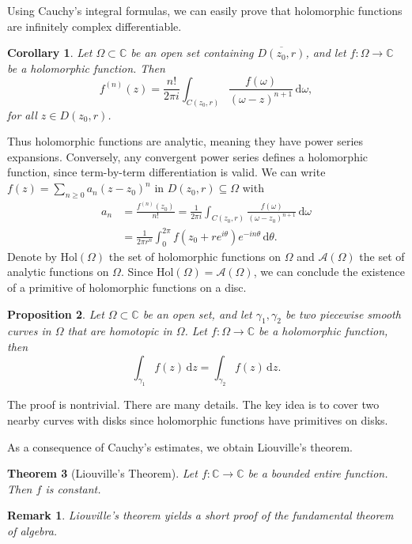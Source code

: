 \documentclass{article}
\newtheorem{theorem}{Theorem}[section]
\newtheorem{corollary}[theorem]{Corollary}
\newtheorem*{remark}{Remark}
\newtheorem{proposition}[theorem]{Proposition}
\theoremstyle{definition}
\newcommand{\C}{\mathbb{C}}
\newcommand{\dd}{\mathrm{d}}
\newcommand{\hol}{\mathrm{Hol}}
\renewcommand{\geq}{\geqslant}
\begin{document}
Using Cauchy's integral formulas, we can easily prove that holomorphic functions are infinitely complex differentiable. 
\begin{corollary}
    Let \(\Omega\subset\C\) be an open set containing $\overline{D(z_0,r)}$, and let \(f\colon\Omega\to\C\) be a holomorphic function. Then
\begin{equation*}
    f^{(n)}(z) = \frac{n!}{2\pi i} \int_{C(z_0,r)} \frac{f(\omega)}{(\omega-z)^{n+1}}\, \dd \omega,
\end{equation*}
for all $z\in D(z_0,r)$.
\end{corollary}
Thus holomorphic functions are analytic, meaning they have power series expansions. Conversely, any convergent power series defines a holomorphic function, since term-by-term differentiation is valid.
We can write $f(z)=\sum_{n\geq 0} a_n (z-z_0)^n$ in $D(z_0,r)\subseteq \Omega$ with 
\begin{align*}
a_n&=\frac{f^{(n)}(z_0)}{n!}=\frac{1}{2\pi i} \int_{C(z_0,r)} \frac{f(\omega)}{(\omega-z_0)^{n+1}}\, 
\dd \omega\\
&=\frac{1}{2\pi r^n}\int_{0}^{2\pi}f\left(z_0+re^{i\theta}\right)e^{-in\theta}\, \dd\theta.
\end{align*}
Denote by $\hol(\Omega)$ the set of holomorphic functions on $\Omega$ and $\mathcal{A}(\Omega)$ the set of analytic functions on $\Omega$. Since $\hol(\Omega)=\mathcal{A}(\Omega)$, we can conclude the existence of a primitive of holomorphic functions on a disc.
\begin{proposition}
Let $\Omega\subset\C$ be an open set, and let $\gamma_1,\gamma_2$ be two piecewise smooth curves in $\Omega$ that are homotopic in $\Omega$. Let \(f\colon\Omega\to\C\) be a holomorphic function, then
\begin{equation*}
    \int_{\gamma_1} f(z)\, \dd z = \int_{\gamma_2} f(z)\, \dd z.
\end{equation*}
\end{proposition}
The proof is nontrivial. There are many details. The key idea is to cover two nearby curves with disks since holomorphic functions have primitives on disks.

As a consequence of Cauchy's estimates, we obtain Liouville's theorem.
\begin{theorem}[Liouville's Theorem]
Let \(f\colon\C\to\C\) be a bounded entire function. Then \(f\) is constant.
\end{theorem}
\begin{remark}
    Liouville's theorem yields a short proof of the fundamental theorem of algebra.
\end{remark}
\end{document}
